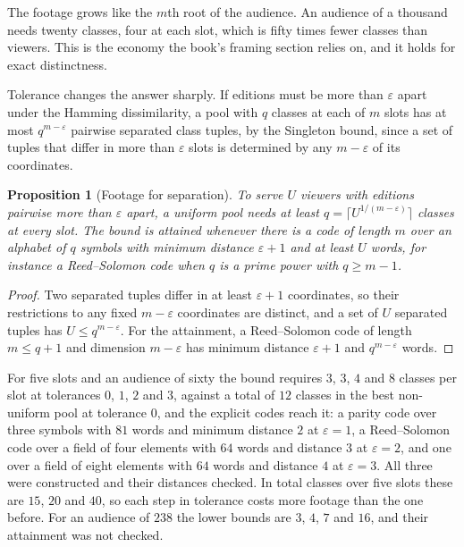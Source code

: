 \documentclass[11pt,twoside,openright]{book}
\theoremstyle{plain}
\newtheorem{proposition}[theorem]{Proposition}
\theoremstyle{definition}
\theoremstyle{remark}
\begin{document}
The footage grows like the $m$th root of the audience. An audience of a thousand needs twenty classes, four at each slot, which is fifty times fewer classes than viewers. This is the economy the book's framing section relies on, and it holds for exact distinctness.

Tolerance changes the answer sharply. If editions must be more than $\varepsilon$ apart under the Hamming dissimilarity, a pool with $q$ classes at each of $m$ slots has at most $q^{m-\varepsilon}$ pairwise separated class tuples, by the Singleton bound, since a set of tuples that differ in more than $\varepsilon$ slots is determined by any $m-\varepsilon$ of its coordinates.

\begin{proposition}[Footage for separation]\label{prop:footsep}
To serve $U$ viewers with editions pairwise more than $\varepsilon$ apart, a uniform pool needs at least $q=\lceil U^{1/(m-\varepsilon)}\rceil$ classes at every slot. The bound is attained whenever there is a code of length $m$ over an alphabet of $q$ symbols with minimum distance $\varepsilon+1$ and at least $U$ words, for instance a Reed--Solomon code when $q$ is a prime power with $q\ge m-1$.
\end{proposition}

\begin{proof}
Two separated tuples differ in at least $\varepsilon+1$ coordinates, so their restrictions to any fixed $m-\varepsilon$ coordinates are distinct, and a set of $U$ separated tuples has $U\le q^{m-\varepsilon}$. For the attainment, a Reed--Solomon code of length $m\le q+1$ and dimension $m-\varepsilon$ has minimum distance $\varepsilon+1$ and $q^{m-\varepsilon}$ words.
\end{proof}

For five slots and an audience of sixty the bound requires $3$, $3$, $4$ and $8$ classes per slot at tolerances $0$, $1$, $2$ and $3$, against a total of $12$ classes in the best non-uniform pool at tolerance $0$, and the explicit codes reach it: a parity code over three symbols with $81$ words and minimum distance $2$ at $\varepsilon=1$, a Reed--Solomon code over a field of four elements with $64$ words and distance $3$ at $\varepsilon=2$, and one over a field of eight elements with $64$ words and distance $4$ at $\varepsilon=3$. All three were constructed and their distances checked. In total classes over five slots these are $15$, $20$ and $40$, so each step in tolerance costs more footage than the one before. For an audience of $238$ the lower bounds are $3$, $4$, $7$ and $16$, and their attainment was not checked.
\end{document}
